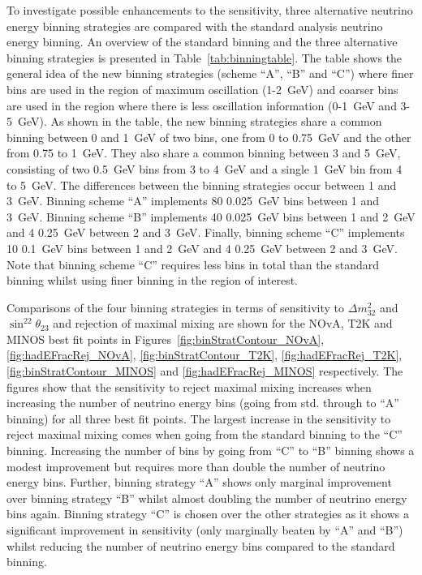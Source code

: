 To investigate possible enhancements to the sensitivity, three
alternative neutrino energy binning strategies are compared with the
standard analysis neutrino energy binning. An overview of the standard
binning and the three alternative binning strategies is presented in
Table~\ref{tab:binningtable}.  
The table shows the general idea of the new binning strategies (scheme
``A'', ``B'' and ``C'') where finer bins are used in the region of
maximum oscillation (1-2~GeV) and coarser bins are used in the region
where there is less oscillation information (0-1~GeV and 3-5~GeV). 
As shown in the table, the new binning strategies share a common
binning between 0 and 1~GeV of two bins, one from 0 to 0.75~GeV and
the other from 0.75 to 1~GeV. 
They also share a common binning between 3 and 5~GeV,
consisting of two 0.5~GeV bins from 3 to 4~GeV and a single 1~GeV bin
from 4 to 5~GeV.
The differences between the binning strategies occur between 1 and
3~GeV. Binning scheme ``A'' implements 80 0.025~GeV bins between 1 and
3~GeV.  
Binning scheme ``B'' implements 40 0.025~GeV bins between 1 and 2~GeV
and 4 0.25~GeV between 2 and 3~GeV. 
Finally, binning scheme ``C'' implements 10 0.1~GeV bins between 1 and
2~GeV and 4 0.25~GeV between 2 and 3~GeV. Note that binning scheme
``C'' requires less bins in total than the standard binning whilst using finer
binning in the region of interest.

Comparisons of the four binning strategies in terms of sensitivity to
$\Delta m^2_{32}$ and $\sin^22\theta_{23}$ and rejection of maximal
mixing are shown for the NOvA, T2K and MINOS best fit points in
Figures~\ref{fig:binStratContour_NOvA}, \ref{fig:hadEFracRej_NOvA},
\ref{fig:binStratContour_T2K}, \ref{fig:hadEFracRej_T2K},
\ref{fig:binStratContour_MINOS} and \ref{fig:hadEFracRej_MINOS}
respectively. The figures show that the sensitivity to reject maximal
mixing increases when increasing the number of neutrino energy bins
(going from std. through to ``A'' binning) for all three best fit
points. The 
largest increase in the sensitivity to reject maximal mixing comes
when going from the standard binning to the ``C'' binning. 
Increasing the number of bins by going from ``C'' to 
``B'' binning shows a modest improvement but requires more than double the
number of neutrino energy bins. Further, binning strategy ``A'' shows
only marginal improvement over binning strategy ``B'' whilst almost
doubling  the number of neutrino energy bins again.  
Binning strategy ``C'' is chosen over the other strategies as it shows
a significant improvement in sensitivity (only marginally beaten by
``A'' and ``B'') whilst reducing the number of neutrino energy bins
compared to the standard binning.


